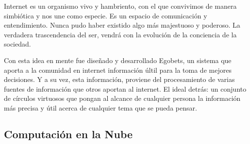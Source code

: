 Internet es un organismo vivo y hambriento, con el que convivimos de manera simbiótica y nos une como especie. Es un espacio de comunicación y entendimiento. Nunca pudo haber existido algo más majestuoso y poderoso. La verdadera trascendencia del ser, vendrá con la evolución de la conciencia de la sociedad.

Con esta idea en mente fue diseñado y desarrollado Egobets, un sistema que aporta a la comunidad en internet información últil para la toma de mejores decisiones. Y a su vez, esta información, proviene del procesamiento de varias fuentes de información que otros aportan al internet. El ideal detrás: un conjunto de círculos virtuosos que pongan al alcance de cualquier persona la información más precisa y útil acerca de cualquier tema que se pueda pensar.

\subsection{Computación en la Nube}

